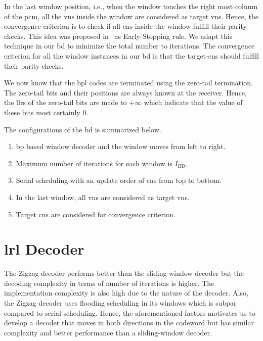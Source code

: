 In the last window position, i.e., when the window touches the right most column of the \gls{pcm}, all the \glspl{vn} inside the window are considered as target \glspl{vn}. Hence, the convergence criterion is to check if all \glspl{cn} inside the window fulfill their parity checks. This idea was proposed in~\cite{Ali2018} as Early-Stopping rule. We adapt this technique in our \gls{bd} to minimize the total number to iterations. The convergence criterion for all the window instances in our \gls{bd} is that the target-\glspl{cn} should fulfill their parity checks.

We now know that the \gls{bpl} codes are terminated using the zero-tail termination. The zero-tail bits and their positions are always known at the receiver. Hence, the \glspl{llr} of the zero-tail bits are made to $+\infty$ which indicate that the value of these bits most certainly 0.

The configurations of the \gls{bd} is summarized below.
\begin{enumerate}
  \item \gls{bp} based window decoder and the window moves from left to right.
  \item Maximum number of iterations for each window is $I_{\text{BD}}$.
  \item Serial scheduling with an update order of \glspl{cn} from top to bottom.
  \item In the last window, all \glspl{vn} are considered as target \glspl{vn}.
  \item Target \glspl{cn} are considered for convergence criterion.
\end{enumerate}

\section{\texorpdfstring{\acrlong{lrl}}{LRL} Decoder}
The Zigzag decoder performs better than the sliding-window decoder but the decoding complexity in terms of number of iterations is higher. The implementation complexity is also high due to the nature of the decoder. Also, the Zigzag decoder uses flooding scheduling in its windows which is subpar compared to serial scheduling. Hence, the aforementioned factors motivates us to develop a decoder that moves in both directions in the codeword but has similar complexity and better performance than a sliding-window decoder.

